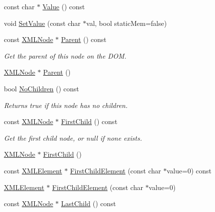 \begin{DoxyCompactItemize}
\item 
const char $\ast$ \hyperlink{classtinyxml2_1_1_x_m_l_node_a92835c779871918f9af569bfe9669fe6}{Value} () const 
\item 
void \hyperlink{classtinyxml2_1_1_x_m_l_node_a09dd68cf9eae137579f6e50f36487513}{Set\+Value} (const char $\ast$val, bool static\+Mem=false)
\item 
const \hyperlink{classtinyxml2_1_1_x_m_l_node}{X\+M\+L\+Node} $\ast$ \hyperlink{classtinyxml2_1_1_x_m_l_node_a4e39bdcf9bfafa55d04857ece6aaf64e}{Parent} () const 
\begin{DoxyCompactList}\small\item\em Get the parent of this node on the D\+O\+M. \end{DoxyCompactList}\item 
\hyperlink{classtinyxml2_1_1_x_m_l_node}{X\+M\+L\+Node} $\ast$ \hyperlink{classtinyxml2_1_1_x_m_l_node_a76029693a5a54fbb721a41d7a0ca8a97}{Parent} ()
\item 
bool \hyperlink{classtinyxml2_1_1_x_m_l_node_a96afe34a9ccd0ed4c0cff32beb42cc6c}{No\+Children} () const 
\begin{DoxyCompactList}\small\item\em Returns true if this node has no children. \end{DoxyCompactList}\item 
const \hyperlink{classtinyxml2_1_1_x_m_l_node}{X\+M\+L\+Node} $\ast$ \hyperlink{classtinyxml2_1_1_x_m_l_node_a60e923d13d7dc01f45ab90a2f948b02a}{First\+Child} () const 
\begin{DoxyCompactList}\small\item\em Get the first child node, or null if none exists. \end{DoxyCompactList}\item 
\hyperlink{classtinyxml2_1_1_x_m_l_node}{X\+M\+L\+Node} $\ast$ \hyperlink{classtinyxml2_1_1_x_m_l_node_a2d6c70c475146b48bc93a7fafdeff5e0}{First\+Child} ()
\item 
const \hyperlink{classtinyxml2_1_1_x_m_l_element}{X\+M\+L\+Element} $\ast$ \hyperlink{classtinyxml2_1_1_x_m_l_node_a20f48e99b03e9c17487944f229bee130}{First\+Child\+Element} (const char $\ast$value=0) const 
\item 
\hyperlink{classtinyxml2_1_1_x_m_l_element}{X\+M\+L\+Element} $\ast$ \hyperlink{classtinyxml2_1_1_x_m_l_node_a7614c3b4eea1ff11b2aa90b0f92f6dba}{First\+Child\+Element} (const char $\ast$value=0)
\item 
const \hyperlink{classtinyxml2_1_1_x_m_l_node}{X\+M\+L\+Node} $\ast$ \hyperlink{classtinyxml2_1_1_x_m_l_node_a6088246532b02895beb0e6fa561a7f3b}{Last\+Child} () const 

\end{DoxyCompactItemize}
